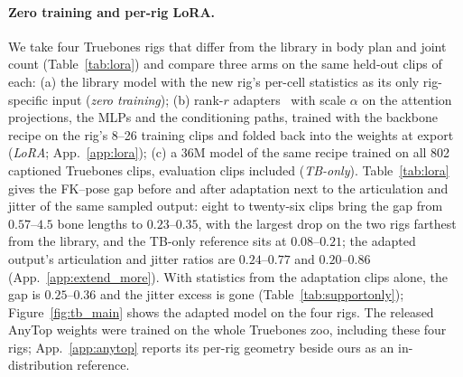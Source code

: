 \paragraph{Zero training and per-rig LoRA.} We take four Truebones rigs that differ from the library in body
plan and joint count (Table~\ref{tab:lora}) and compare three arms on the same held-out clips of each: (a) the library model with the new rig's per-cell
statistics as its only rig-specific input
(\emph{zero training}); (b) rank-$r$ adapters~\citep{hu2022lora} with scale $\alpha$ on the attention
projections, the MLPs and the conditioning paths, trained with the backbone recipe on the rig's 8--26 training clips
and folded back into the weights at export (\emph{LoRA}; App.~\ref{app:lora}); (c) a \num{36}M model of the same recipe trained on all \num{802}
captioned Truebones clips, evaluation clips included (\emph{TB-only}). Table~\ref{tab:lora} gives the
FK--pose gap before and after adaptation next to the articulation and jitter of the same sampled output: eight to
twenty-six clips bring the gap from $0.57$--$4.5$ bone lengths to $0.23$--$0.35$, with the largest drop on the two
rigs farthest from the library, and the TB-only reference sits at $0.08$--$0.21$; the adapted output's
articulation and jitter ratios are $0.24$--$0.77$ and $0.20$--$0.86$ (App.~\ref{app:extend_more}). With
statistics from the adaptation clips alone, the gap is $0.25$--$0.36$ and the jitter excess is gone
(Table~\ref{tab:supportonly}); Figure~\ref{fig:tb_main}
shows the adapted model on the four rigs. The released AnyTop
weights were trained on the whole Truebones zoo, including these four rigs; App.~\ref{app:anytop} reports its
per-rig geometry beside ours as an in-distribution reference.

